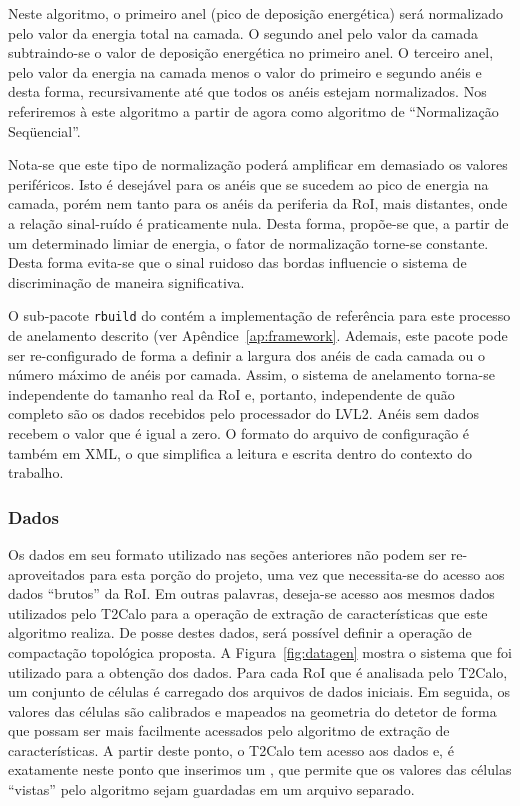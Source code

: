 Neste algoritmo, o primeiro anel (pico de deposição energética) será
normalizado pelo valor da energia total na camada. O segundo anel pelo valor
da camada subtraindo-se o valor de deposição energética no primeiro anel. O
terceiro anel, pelo valor da energia na camada menos o valor do primeiro e
segundo anéis e desta forma, recursivamente até que todos os anéis estejam
normalizados. Nos referiremos à este algoritmo a partir de agora como
algoritmo de ``Normalização Seqüencial''.

Nota-se que este tipo de normalização poderá amplificar em demasiado os
valores periféricos. Isto é desejável para os anéis que se sucedem ao pico de
energia na camada, porém nem tanto para os anéis da periferia da RoI, mais
distantes, onde a relação sinal-ruído é praticamente nula. Desta forma,
propõe-se que, a partir de um determinado limiar de energia, o fator de
normalização torne-se constante. Desta forma evita-se que o sinal ruidoso das
bordas influencie o sistema de discriminação de maneira significativa.

O sub-pacote \texttt{rbuild} do  contém a implementação de
referência para este processo de anelamento descrito (ver
Apêndice~\ref{ap:framework}. Ademais, este pacote pode ser re-configurado de
forma a definir a largura dos anéis de cada camada ou o número máximo de anéis
por camada. Assim, o sistema de anelamento torna-se independente do tamanho
real da RoI e, portanto, independente de quão completo são os dados recebidos
pelo processador do LVL2. Anéis sem dados recebem o valor  que é
igual a zero. O formato do arquivo de configuração é também em XML, o que
simplifica a leitura e escrita dentro do contexto do trabalho.

\subsubsection{Dados}

Os dados em seu formato utilizado nas seções anteriores não podem ser
re-aproveitados para esta porção do projeto, uma vez que necessita-se do
acesso aos dados ``brutos'' da RoI. Em outras palavras, deseja-se acesso aos
mesmos dados utilizados pelo T2Calo para a operação de extração de
características que este algoritmo realiza. De posse destes dados, será
possível definir a operação de compactação topológica proposta. A
Figura~\ref{fig:datagen} mostra o sistema que foi utilizado para a obtenção
dos dados. Para cada RoI que é analisada pelo T2Calo, um conjunto de células é
carregado dos arquivos de dados iniciais. Em seguida, os valores das células
são calibrados e mapeados na geometria do detetor de forma que possam ser mais
facilmente acessados pelo algoritmo de extração de características. A partir
deste ponto, o T2Calo tem acesso aos dados e, é exatamente neste ponto que
inserimos um , que permite que os valores das células ``vistas''
pelo algoritmo sejam guardadas em um arquivo separado.

